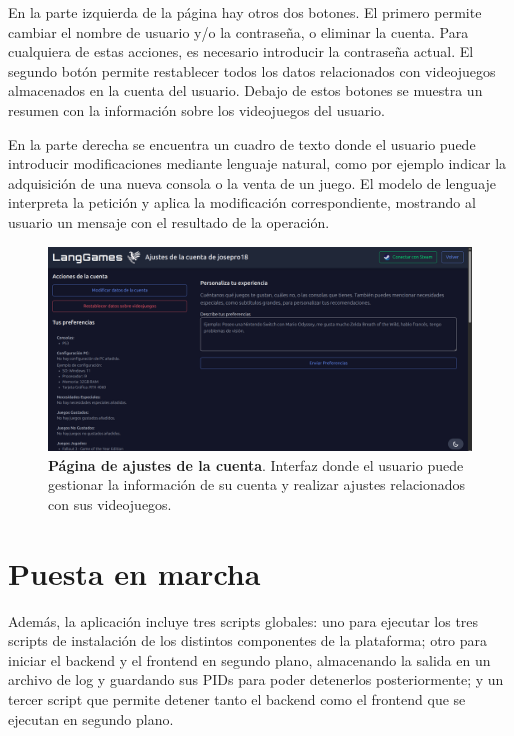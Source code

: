 En la parte izquierda de la página hay otros dos botones. El primero permite cambiar el nombre de usuario y/o la contraseña, o eliminar la cuenta. Para cualquiera de estas acciones, es necesario introducir la contraseña actual. El segundo botón permite restablecer todos los datos relacionados con videojuegos almacenados en la cuenta del usuario. Debajo de estos botones se muestra un resumen con la información sobre los videojuegos del usuario.

En la parte derecha se encuentra un cuadro de texto donde el usuario puede introducir modificaciones mediante lenguaje natural, como por ejemplo indicar la adquisición de una nueva consola o la venta de un juego. El modelo de lenguaje interpreta la petición y aplica la modificación correspondiente, mostrando al usuario un mensaje con el resultado de la operación.

\begin{figure}[H]
	\centering
	\includegraphics[width=1\linewidth]{imagenes/ajustesCuenta.png}
	\caption[\textbf{Página de ajustes de la cuenta}.]{\textbf{Página de ajustes de la cuenta}. Interfaz donde el usuario puede gestionar la información de su cuenta y realizar ajustes relacionados con sus videojuegos.}
	\label{imagen-ajustes}
\end{figure}

\newpage

\section{Puesta en marcha}

Además, la aplicación incluye tres scripts globales: uno para ejecutar los tres scripts de instalación de los distintos componentes de la plataforma; otro para iniciar el backend y el frontend en segundo plano, almacenando la salida en un archivo de log y guardando sus PIDs para poder detenerlos posteriormente; y un tercer script que permite detener tanto el backend como el frontend que se ejecutan en segundo plano.
